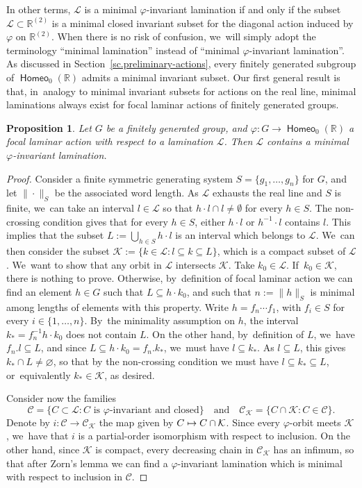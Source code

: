 \documentclass[JEP,XML,SOM,Unicode,NoFloatCountersInSection,published]{cedram}
\def\mto{\mathchoice{\longmapsto}{\mapsto}{\mapsto}{\mapsto}}
\newtheorem{prop}[thm]{Proposition}
\theoremstyle{definition}
\DeclareMathOperator{\homeo}{\mathsf{Homeo}}
\newcommand{\R}{\mathbb{R}}
\newcommand{\Lcal}{\mathcal{L}}
\begin{document}
In other terms, $\Lcal$ is a minimal $\varphi$-invariant lamination if and only if the subset \hbox{$\Lcal\subset\R^{(2)}$} is a minimal closed invariant subset for the diagonal action induced by $\varphi$ on $\R^{(2)}$. When there is no risk of confusion, we~will simply adopt the terminology ``minimal lamination'' instead of ``minimal $\varphi$-invariant lamination''.
As discussed in Section~\ref{sc.preliminary-actions}, every finitely generated subgroup of $\homeo_0(\R)$ admits a minimal invariant subset. Our first general result is that, in~analogy to minimal invariant subsets for actions on the real line, minimal laminations always exist for focal laminar actions of finitely generated groups.

\begin{prop}\label{prop.minimalamination} Let $G$ be a finitely generated group, and $\varphi\colon G\to\homeo_0(\R) $ a focal laminar action with respect to a lamination $\Lcal$. Then $\Lcal$ contains a minimal $\varphi$-invariant lamination.
\end{prop}
\begin{proof} Consider a finite symmetric generating system $S=\{g_1,\ldots,g_n\}$ for $G$, and let $\|{\cdot}\|_S$ be the associated word length. As $\Lcal$ exhausts the real line and $S$ is finite, we~can take an interval $l\in\Lcal$ so that $h\cdot l\cap l\neq\emptyset$ for every $h\in S$. The non-crossing condition gives that for every $h\in S$, either $h\cdot l$ or $h^{-1}\cdot l$ contains $l$. This implies that the subset $L:=\bigcup_{h\in S} h\cdot l$ is an interval which belongs to $\Lcal$. We~can then consider the subset $\mathcal K:=\{k\in\Lcal:l\subseteq k\subseteq L\}$, which is a compact subset of $\Lcal$. We~want to show that any orbit in $\Lcal$ intersects $\mathcal K$.
Take $k_0\in\Lcal$. If~$k_0\in \mathcal K$, there is nothing to prove. Otherwise, by~definition of focal laminar action we can find an element $h\in G$ such that $L\subseteq h\cdot k_0$, and such that $n:=\|h\|_S$ is minimal among lengths of elements with this property.
Write $h=f_n\cdots f_1$, with $f_i\in S$ for every $i\in \{1,\ldots,n\}$. By~the minimality assumption on $h$, the interval $k_*=f_n^{-1}h\cdot k_0$ does not contain $L$. On the other hand, by~definition of $L$, we~have $f_n.l\subseteq L$, and since $L\subseteq h\cdot k_0 = f_n.k_*$, we~must have $l\subseteq k_*$. As $l\subseteq L$, this gives $k_*\cap L\neq \varnothing$, so that by the non-crossing condition we must have $l\subseteq k_*\subseteq L$, or~equivalently $k_*\in \mathcal K$, as desired.

Consider now the families
\[\mathcal{C}=\{C\subset\Lcal:C\text{ is }\varphi\text{-invariant and closed}\}\quad\text{and}\quad\mathcal{C}_{\mathcal K}=\{C\cap \mathcal K:C\in\mathcal{C}\}.
\]
Denote by $i\colon \mathcal{C}\to\mathcal{C}_{\mathcal K}$ the map given by $C\mto C\cap \mathcal K$. Since every $\varphi$-orbit meets $\mathcal K$, we~have that $i$ is a partial-order isomorphism with respect to inclusion. On the other hand, since $\mathcal K$ is compact, every decreasing chain in $\mathcal{C}_{\mathcal K}$ has an infimum, so that {after Zorn's lemma} we can find a $\varphi$-invariant lamination which is minimal with respect to inclusion in $\mathcal{C}$.
\end{proof}
\end{document}

